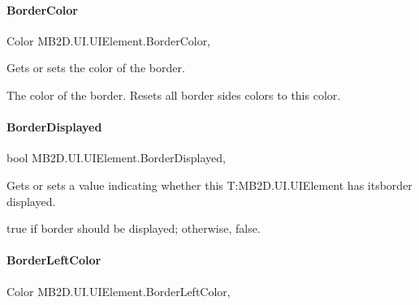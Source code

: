 \paragraph{\texorpdfstring{Border\+Color}{BorderColor}}
{\footnotesize\ttfamily Color M\+B2\+D.\+U\+I.\+U\+I\+Element.\+Border\+Color\hspace{0.3cm}{\ttfamily [get]}, {\ttfamily [set]}}



Gets or sets the color of the border. 

The color of the border. Resets all border sides\textquotesingle{} colors to this color.\hypertarget{class_m_b2_d_1_1_u_i_1_1_u_i_element_a27fdfa5d734c96e8249bb7955d2d069c}{}\label{class_m_b2_d_1_1_u_i_1_1_u_i_element_a27fdfa5d734c96e8249bb7955d2d069c} 
\paragraph{\texorpdfstring{Border\+Displayed}{BorderDisplayed}}
{\footnotesize\ttfamily bool M\+B2\+D.\+U\+I.\+U\+I\+Element.\+Border\+Displayed\hspace{0.3cm}{\ttfamily [get]}, {\ttfamily [set]}}



Gets or sets a value indicating whether this T\+:\+M\+B2\+D.\+U\+I.\+U\+I\+Element has itsborder displayed. 

{\ttfamily true} if border should be displayed; otherwise, {\ttfamily false}.\hypertarget{class_m_b2_d_1_1_u_i_1_1_u_i_element_aef07fe4fd9fef08485aa7265f4b9128b}{}\label{class_m_b2_d_1_1_u_i_1_1_u_i_element_aef07fe4fd9fef08485aa7265f4b9128b} 
\paragraph{\texorpdfstring{Border\+Left\+Color}{BorderLeftColor}}
{\footnotesize\ttfamily Color M\+B2\+D.\+U\+I.\+U\+I\+Element.\+Border\+Left\+Color\hspace{0.3cm}{\ttfamily [get]}, {\ttfamily [set]}}



